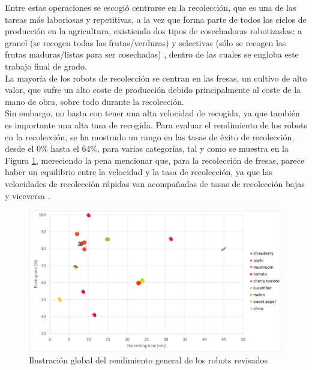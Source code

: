 Entre estas operaciones se escogió centrarse en la recolección, que es una de las tareas más laboriosas y repetitivas, a la vez que forma parte de todos los ciclos de producción en la agricultura, existiendo dos tipos de cosechadoras robotizadas: a granel (se recogen todas las frutas/verduras) y selectivas (sólo se recogen las frutas maduras/listas para ser cosechadas) \cite{Fountas20}, dentro de las cuales se engloba este trabajo final de grado. \\

La mayoría de los robots de recolección se centran en las fresas, un cultivo de alto valor, que sufre un alto coste de producción debido principalmente al coste de la mano de obra, sobre todo durante la recolección.\\ %

Sin embargo, no basta con tener una alta velocidad de recogida, ya que también es importante una alta tasa de recogida. %
Para evaluar el rendimiento de los robots en la recolección, se ha mostrado un rango en las tasas de éxito de recolección, desde el 0\% hasta el 64\%, para varias categorías, tal y como se muestra en la Figura \ref{fig:RendimientosCosecha}, mereciendo la pena mencionar que, para la recolección de fresas, parece haber un equilibrio entre la velocidad y la tasa de recolección, ya que las velocidades de recolección rápidas van acompañadas de tasas de recolección bajas y viceversa \cite{Fountas20}. 

\begin{figure} [H]
    \begin{center}
      \includegraphics[width=15cm]{figs/Rendimiento cosecha robots.png}
    \end{center}
    \caption{Ilustración global del rendimiento general de los robots revisados}
    \label{fig:RendimientosCosecha}
\end{figure}

